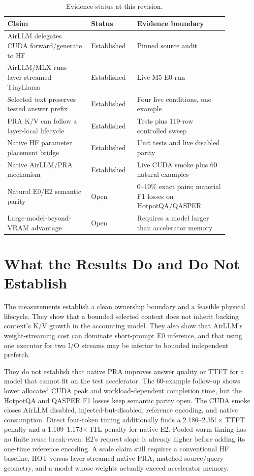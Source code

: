 \documentclass[10pt]{article}
\begin{document}
\begin{table}[t]
\centering
\caption{Evidence status at this revision.}
\label{tab:status}
\small
\begin{tabular}{p{0.34\linewidth}p{0.18\linewidth}p{0.37\linewidth}}
\toprule
Claim & Status & Evidence boundary \\
\midrule
AirLLM delegates CUDA forward/generate to HF & Established & Pinned source audit \\
AirLLM/MLX runs layer-streamed TinyLlama & Established & Live M5 E0 run \\
Selected text preserves tested answer prefix & Established & Four live conditions, one example \\
PRA K/V can follow a layer-local lifecycle & Established & Tests plus 119-row controlled sweep \\
Native HF parameter placement bridge & Established & Unit tests and live disabled parity \\
Native AirLLM/PRA mechanism & Established & Live CUDA smoke plus 60 natural examples \\
Natural E0/E2 semantic parity & Open & 0--10\% exact pairs; material F1 losses on HotpotQA/QASPER \\
Large-model-beyond-VRAM advantage & Open & Requires a model larger than accelerator memory \\
\bottomrule
\end{tabular}
\end{table}

\section{What the Results Do and Do Not Establish}

The measurements establish a clean ownership boundary and a feasible physical
lifecycle. They show that a bounded selected context does not inherit backing
context's K/V growth in the accounting model. They also show that AirLLM's
weight-streaming cost can dominate short-prompt E0 inference, and that using one
executor for two I/O streams may be inferior to bounded independent prefetch.

They do not establish that native PRA improves answer quality or TTFT for a
model that cannot fit on the test accelerator. The 60-example follow-up shows
lower allocated CUDA peak and workload-dependent completion time, but the
HotpotQA and QASPER F1 losses keep semantic parity open. The CUDA smoke closes
AirLLM disabled, injected-but-disabled, reference encoding, and native
consumption. Direct four-token timing additionally finds a 2.186--2.351$\times$
TTFT penalty and a 1.109--1.173$\times$ ITL penalty for native E2. Pooled warm
timing has no finite reuse break-even: E2's request slope is already higher
before adding its one-time reference encoding. A scale claim still requires a
conventional HF baseline, HOT
versus layer-streamed native PRA, matched source/query geometry, and a model
whose weights actually exceed accelerator memory.
\end{document}
